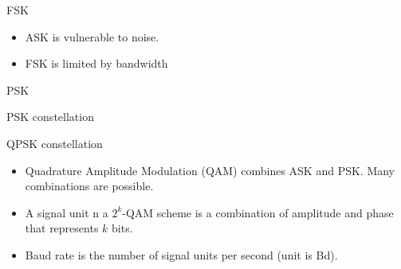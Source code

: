 \begin{cf}{
	FSK
	\vspace{1cm}

}
\end{cf}

\begin{cf}{\small
	\begin{itemize}
	\item ASK is vulnerable to noise.
	\item FSK is limited by bandwidth
	\end{itemize}
}
\end{cf}

\begin{cf}{
	PSK
	\vspace{1cm}

}
\end{cf}

\begin{cf}{
	PSK constellation
	\vspace{1cm}

}
\end{cf}

\begin{cf}{
	QPSK constellation
	\vspace{1cm}

}
\end{cf}

\begin{cf}{\small
	\begin{itemize}
	\item Quadrature Amplitude Modulation (QAM) combines ASK and PSK.  Many combinations are possible.
	\item A signal unit n a $2^k$-QAM scheme is a combination of amplitude and phase that represents $k$ bits.
	\item Baud rate is the number of signal units per second (unit is Bd).
	\end{itemize}
}
\end{cf}


